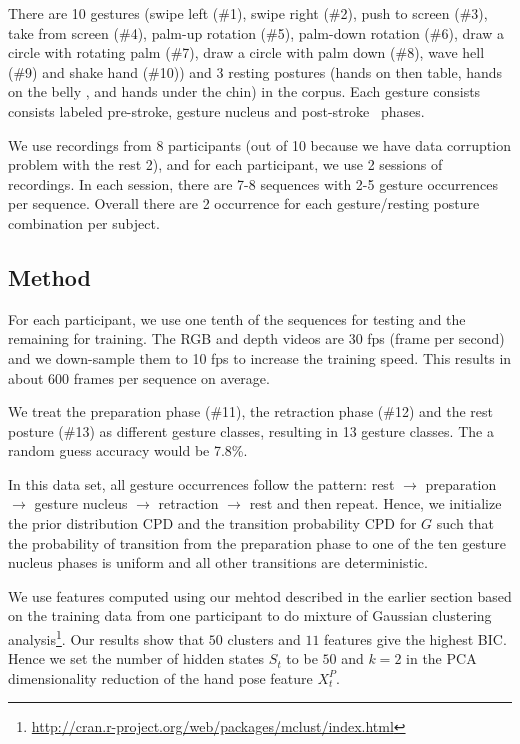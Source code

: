 \documentclass{sigchi}
\begin{document}
There are 10 gestures (swipe left (\#1), swipe right (\#2), push to screen
(\#3), take from screen (\#4), palm-up rotation (\#5), palm-down rotation (\#6),
draw a circle with rotating palm (\#7), draw a circle with palm down (\#8), wave
hell (\#9) and shake hand (\#10)) and 3 resting postures (hands on then table,
hands on the belly , and hands under the chin) in the corpus.
Each gesture consists consists labeled pre-stroke, gesture nucleus and
post-stroke~\cite{Pavlovic97} phases.

We use recordings from 8 participants (out of 10 because we have data
corruption problem with the rest 2), and for each participant, we use 2 sessions
of recordings.
In each session, there are 7-8 sequences with 2-5 gesture occurrences per
sequence. Overall there are 2 occurrence for each gesture/resting posture combination per subject.

\subsection{Method}
For each participant, we use
one tenth of the sequences for testing and the remaining for training. 
The RGB and depth videos are 30 fps (frame per second) and we down-sample them
to 10 fps to increase the training speed. This results in about 600 frames per sequence on average.

We treat the preparation phase (\#11), the retraction phase (\#12) and the rest posture (\#13) 
as different gesture classes, resulting
in 13 gesture classes. The a random guess accuracy would be
7.8\%.


In this data set, all gesture occurrences follow the pattern: rest $\rightarrow$ preparation
$\rightarrow$ gesture nucleus $\rightarrow$ retraction $\rightarrow$ rest and then repeat. 
Hence, we initialize the prior distribution CPD
and the transition probability CPD for $G$ such that the probability of transition from the preparation phase
to one of the ten gesture nucleus phases is uniform and all other transitions are deterministic.

We use features computed using our mehtod described in the earlier section based
on the training data from one participant to do mixture of Gaussian clustering analysis\footnote{\url{http://cran.r-project.org/web/packages/mclust/index.html}}. 
Our results show that $50$ clusters and
$11$ features give the highest BIC. Hence we set the 
number of hidden states $S_t$ to be $50$ and $k = 2$
in the PCA dimensionality reduction of the hand pose feature $X_t^P$.
\end{document}
